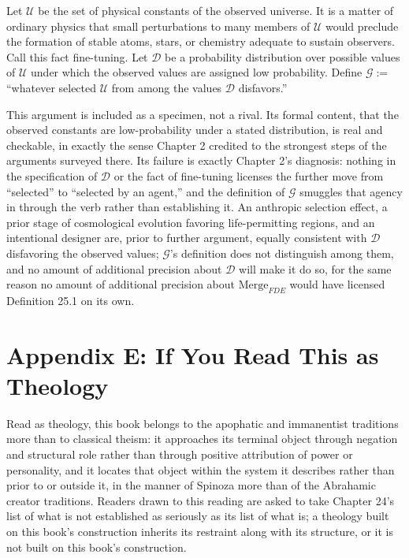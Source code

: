 \documentclass[11pt]{book}
\begin{document}
Let $\mathcal U$ be the set of physical constants of the observed universe. It is a matter of ordinary physics that small perturbations to many members of $\mathcal U$ would preclude the formation of stable atoms, stars, or chemistry adequate to sustain observers. Call this fact fine-tuning. Let $\mathcal D$ be a probability distribution over possible values of $\mathcal U$ under which the observed values are assigned low probability. Define $\mathcal G := $ ``whatever selected $\mathcal U$ from among the values $\mathcal D$ disfavors.''

This argument is included as a specimen, not a rival. Its formal content, that the observed constants are low-probability under a stated distribution, is real and checkable, in exactly the sense Chapter 2 credited to the strongest steps of the arguments surveyed there. Its failure is exactly Chapter 2's diagnosis: nothing in the specification of $\mathcal D$ or the fact of fine-tuning licenses the further move from ``selected'' to ``selected by an agent,'' and the definition of $\mathcal G$ smuggles that agency in through the verb rather than establishing it. An anthropic selection effect, a prior stage of cosmological evolution favoring life-permitting regions, and an intentional designer are, prior to further argument, equally consistent with $\mathcal D$ disfavoring the observed values; $\mathcal G$'s definition does not distinguish among them, and no amount of additional precision about $\mathcal D$ will make it do so, for the same reason no amount of additional precision about $\mathrm{Merge}_{FDE}$ would have licensed Definition 25.1 on its own.

\chapter*{Appendix E: If You Read This as Theology}

Read as theology, this book belongs to the apophatic and immanentist traditions more than to classical theism: it approaches its terminal object through negation and structural role rather than through positive attribution of power or personality, and it locates that object within the system it describes rather than prior to or outside it, in the manner of Spinoza more than of the Abrahamic creator traditions. Readers drawn to this reading are asked to take Chapter 24's list of what is not established as seriously as its list of what is; a theology built on this book's construction inherits its restraint along with its structure, or it is not built on this book's construction.
\end{document}
